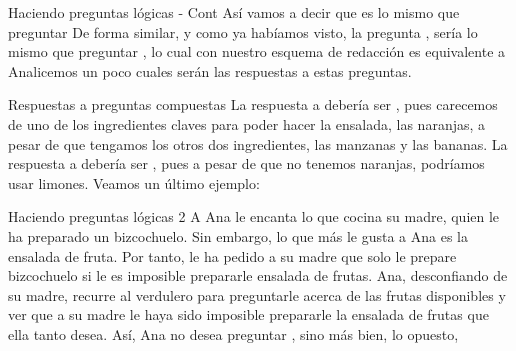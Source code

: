 
\begin{frame}{Haciendo preguntas lógicas - Cont}
  Así vamos a decir que  es lo
  mismo que preguntar 
  \jump
  De forma similar, y como ya habíamos visto, la pregunta
  , sería lo mismo que preguntar
  , lo cual con nuestro esquema de
  redacción es equivalente a 
  \jump
  Analicemos un poco cuales serán las respuestas a estas preguntas.
\end{frame}


\begin{frame}{Respuestas a preguntas compuestas}
  La respuesta a  debería ser
  \fullfalse, pues carecemos de uno de los ingredientes claves para poder hacer
  la ensalada, las naranjas, a pesar de que tengamos los otros dos ingredientes,
  las manzanas y las bananas.
  \jump
  La respuesta a  debería ser
  \fulltrue, pues a pesar de que no tenemos naranjas, podríamos usar limones.
  \jump
  Veamos un último ejemplo:
\end{frame}


\begin{frame}{Haciendo preguntas lógicas 2}
  A Ana le encanta lo que cocina su madre, quien le ha preparado un bizcochuelo.
  Sin embargo, lo que más le gusta a Ana es la ensalada de fruta. Por tanto, le
  ha pedido a su madre que solo le prepare bizcochuelo si le es imposible prepararle
  ensalada de frutas.
  \jump
  Ana, desconfiando de su madre, recurre al verdulero para preguntarle acerca
  de las frutas disponibles y ver que a su madre le haya sido imposible prepararle
  la ensalada de frutas que ella tanto desea.
  \jump
  Así, Ana no desea preguntar ,
  sino más bien, lo opuesto, 
\end{frame}



